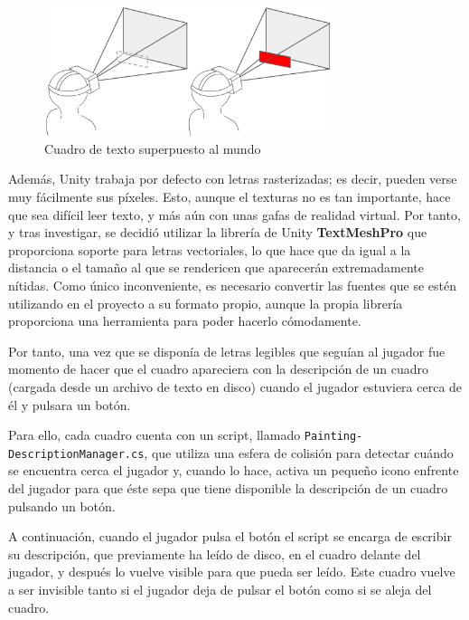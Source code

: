 \begin{figure}[!h]
\begin{center}
\includegraphics[width=0.75\textwidth]{imagenes/7/camera-overlay.png}
\caption{Cuadro de texto superpuesto al mundo}
\label{fig:camera-overlay}
\end{center}
\end{figure}

Además, Unity trabaja por defecto con letras rasterizadas; es decir, pueden verse muy fácilmente sus píxeles. Esto, aunque el texturas no es tan importante, hace que sea difícil leer texto, y más aún con unas gafas de realidad virtual. Por tanto, y tras investigar, se decidió utilizar la librería de Unity \textbf{TextMeshPro} que proporciona soporte para letras vectoriales, lo que hace que da igual a la distancia o el tamaño al que se rendericen que aparecerán extremadamente nítidas. Como único inconveniente, es necesario convertir las fuentes que se estén utilizando en el proyecto a su formato propio, aunque la propia librería proporciona una herramienta para poder hacerlo cómodamente.

Por tanto, una vez que se disponía de letras legibles que seguían al jugador fue momento de hacer que el cuadro apareciera con la descripción de un cuadro (cargada desde un archivo de texto en disco) cuando el jugador estuviera cerca de él y pulsara un botón.

Para ello, cada cuadro cuenta con un script, llamado \texttt{Painting-} \texttt{DescriptionManager.cs}, que utiliza una esfera de colisión para detectar cuándo se encuentra cerca el jugador y, cuando lo hace, activa un pequeño icono enfrente del jugador para que éste sepa que tiene disponible la descripción de un cuadro pulsando un botón.

A continuación, cuando el jugador pulsa el botón el script se encarga de escribir su descripción, que previamente ha leído de disco, en el cuadro delante del jugador, y después lo vuelve visible para que pueda ser leído. Este cuadro vuelve a ser invisible tanto si el jugador deja de pulsar el botón como si se aleja del cuadro.

